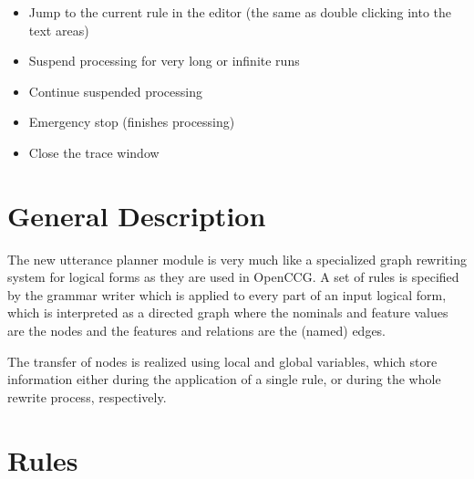 \documentclass[11pt,a4paper]{article}
\begin{document}
\begin{itemize}\addtolength{\itemsep}{-.33\itemsep}
\item Jump to the current rule in the editor (the same as double clicking into
  the text areas)
\item Suspend processing for very long or infinite runs
\item Continue suspended processing
\item Emergency stop (finishes processing)
\item Close the trace window
\end{itemize}

\newpage
\section{General Description}
The new utterance planner module is very much like a specialized graph
rewriting system for logical forms as they are used in OpenCCG. A set of
rules is specified by the grammar writer which is applied to every part of
an input logical form, which is interpreted as a directed graph where the
nominals and feature values are the nodes and the features and relations are
the (named) edges.

The transfer of nodes is realized using local and global variables, which
store information either during the application of a single rule, or during
the whole rewrite process, respectively.

\section{Rules}
\end{document}
